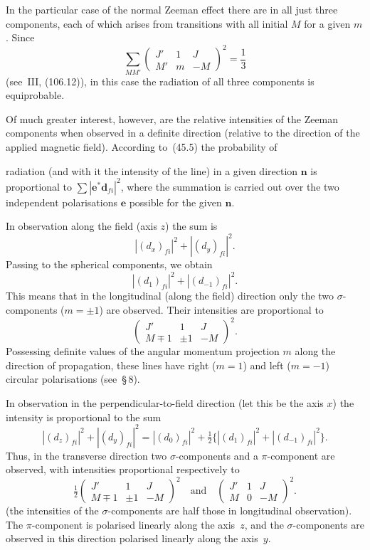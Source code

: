 In the particular case of the normal Zeeman effect there are in all just three components, each of which arises from transitions with all initial $M$ for a given $m$. Since
\begin{equation}
\sum_{MM'}\begin{pmatrix} J' & 1 & J \\ M' & m & -M\end{pmatrix}^{\!2} = \frac{1}{3}
\tag{51.6}
\end{equation}
(see~III, (106.12)), in this case the radiation of all three components is equiprobable.

Of much greater interest, however, are the relative intensities of the Zeeman components when observed in a definite direction (relative to the direction of the applied magnetic field). According to~(45.5) the probability of

radiation (and with it the intensity of the line) in a given direction $\mathbf{n}$ is proportional to $\sum|\mathbf{e}^*\mathbf{d}_{fi}|^2$, where the summation is carried out over the two independent polarisations $\mathbf{e}$ possible for the given $\mathbf{n}$.

In observation along the field (axis $z$) the sum is
\[
|(d_x)_{fi}|^2 + |(d_y)_{fi}|^2.
\]
Passing to the spherical components, we obtain
\[
|(d_1)_{fi}|^2 + |(d_{-1})_{fi}|^2.
\]
This means that in the longitudinal (along the field) direction only the two $\sigma$-components ($m = \pm 1$) are observed. Their intensities are proportional to
\begin{equation}
\begin{pmatrix} J' & 1 & J \\ M \mp 1 & \pm 1 & -M\end{pmatrix}^{\!2}.
\tag{51.7}
\end{equation}
Possessing definite values of the angular momentum projection $m$ along the direction of propagation, these lines have right ($m = 1$) and left ($m = -1$) circular polarisations (see~\S\,8).

In observation in the perpendicular-to-field direction (let this be the axis $x$) the intensity is proportional to the sum
\[
|(d_z)_{fi}|^2 + |(d_y)_{fi}|^2 = |(d_0)_{fi}|^2 + \tfrac{1}{2}\{|(d_1)_{fi}|^2 + |(d_{-1})_{fi}|^2\}.
\]
Thus, in the transverse direction two $\sigma$-components and a $\pi$-component are observed, with intensities proportional respectively to
\begin{equation}
\tfrac{1}{2}\begin{pmatrix} J' & 1 & J \\ M \mp 1 & \pm 1 & -M\end{pmatrix}^{\!2}\quad\text{and}\quad\begin{pmatrix} J' & 1 & J \\ M & 0 & -M\end{pmatrix}^{\!2}.
\tag{51.8}
\end{equation}
(the intensities of the $\sigma$-components are half those in longitudinal observation). The $\pi$-component is polarised linearly along the axis~$z$, and the $\sigma$-components are observed in this direction polarised linearly along the axis~$y$.

